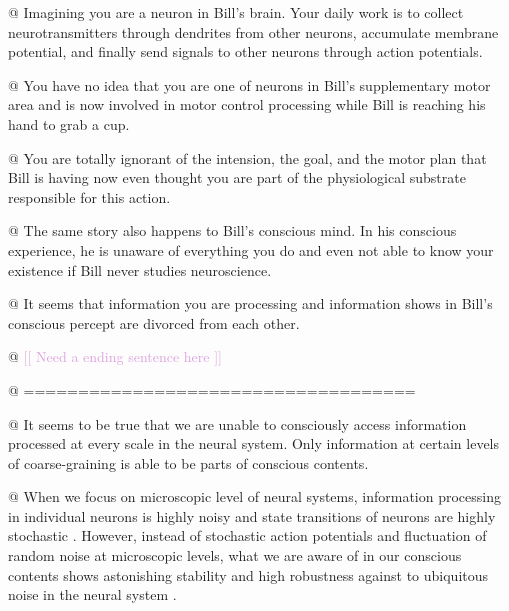 \documentclass[utf8]{article}
\newenvironment{ants}
			{
			 \begin{easylist}[itemize]		
		 	}
			{
			\end{easylist}
			}
\newcommand{\idea}[2][Plum]{\noindent
				\textcolor{#1}{[[ #2 ]]}}
\begin{document}
	
		\begin{ants}
			
				@ Imagining you are a neuron in Bill's brain. Your daily work is to collect neurotransmitters through dendrites from other neurons, accumulate membrane potential, and finally send signals to other neurons through action potentials. 
				
				@ You have no idea that you are one of neurons in Bill's supplementary motor area and is now involved in motor control processing while Bill is reaching his hand to grab a cup. 
				
				@ You are totally ignorant of the intension, the goal, and the motor plan that Bill is having now even thought you are part of the physiological substrate responsible for this action. 
				
				@ The same story also happens to Bill's conscious mind. In his conscious experience, he is unaware of everything you do and even not able to know your existence if Bill never studies neuroscience.
				
				@ It seems that information you are processing and information shows in Bill's conscious percept are divorced from each other. 
				
				@ \idea{Need a ending sentence here}
				
				@ ====================================
				
				
													
			
			
				
				@ It seems to be true that we are unable to consciously access information processed at every scale in the neural system. Only information at certain levels of coarse-graining is able to be parts of conscious contents. 
				
				@ When we focus on microscopic level of neural systems, information processing in individual neurons is highly noisy and state transitions of neurons are highly stochastic \citep{Goldwyn2011, White2000}. However, instead of stochastic action potentials and fluctuation of random noise at microscopic levels, what we are aware of in our conscious contents shows astonishing stability and high robustness against to ubiquitous noise in the neural system \citep{mathis1995computational}.
				

\end{ants}
\end{document}
